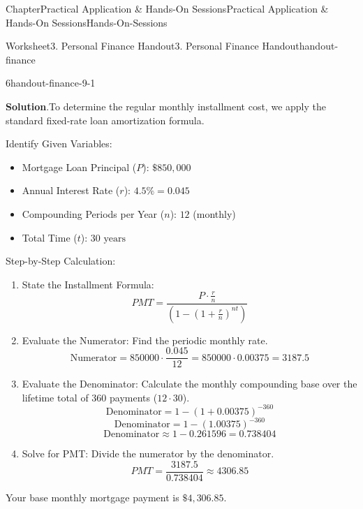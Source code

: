 \documentclass[oneside,10pt,]{book}
\newcommand{\blocktitlefont}{\relax}
\newcommand{\ptxlistdisc}{\raisebox{0.3ex}{\textbullet}}
\begin{document}
\begin{chapterptx}{Chapter}{Practical Application \& Hands-On Sessions}{}{Practical Application \& Hands-On Sessions}{}{}{Hands-On-Sessions}
\begin{worksheet-section}{Worksheet}{3. Personal Finance Handout}{}{3. Personal Finance Handout}{}{}{handout-finance}
\begin{divisionexercise}{6}{}{}{handout-finance-9-1}
\begin{enumerate}[font=\bfseries,label=(\alph*),ref=\alph*]
\noindent\textbf{\blocktitlefont Solution}.\hypertarget{handout-finance-9-1-4-2}{}\quad{}To determine the regular monthly installment cost, we apply the standard fixed-rate loan amortization formula.%
\par
Identify Given Variables:%
\begin{itemize}[label=\ptxlistdisc]
\item{}Mortgage Loan Principal (\(P\)): \(\$850,000\)%
\item{}Annual Interest Rate (\(r\)): \(4.5\% = 0.045\)%
\item{}Compounding Periods per Year (\(n\)): \(12\) (monthly)%
\item{}Total Time (\(t\)): \(30 \text{ years}\)%
\end{itemize}
%
\par
Step-by-Step Calculation:%
\begin{enumerate}[label={(\alph*)}]
\item{}State the Installment Formula:%
\begin{equation*}
PMT = \frac{P \cdot \frac{r}{n}}{\left(1-(1+\frac{r}{n})^{nt}\right)}
\end{equation*}
%
\item{}Evaluate the Numerator: Find the periodic monthly rate.%
\begin{equation*}
\text{Numerator} = 850000 \cdot \frac{0.045}{12} = 850000 \cdot 0.00375 = 3187.5
\end{equation*}
%
\item{}Evaluate the Denominator: Calculate the monthly compounding base over the lifetime total of 360 payments (\(12 \cdot 30\)).%
\begin{equation*}
\text{Denominator} = 1 - \left(1 + 0.00375\right)^{-360}
\end{equation*}
%
\begin{equation*}
\text{Denominator} = 1 - \left(1.00375\right)^{-360}
\end{equation*}
%
\begin{equation*}
\text{Denominator} \approx 1 - 0.261596 = 0.738404
\end{equation*}
%
\item{}Solve for PMT: Divide the numerator by the denominator.%
\begin{equation*}
PMT = \frac{3187.5}{0.738404} \approx 4306.85
\end{equation*}
%
\end{enumerate}
%
\par
Your base monthly mortgage payment is \(\$4,306.85\).%

\end{enumerate}
\end{divisionexercise}
\end{worksheet-section}
\end{chapterptx}
\end{document}
